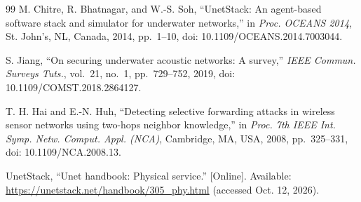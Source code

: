 \documentclass[11pt]{article}
\begin{document}
\begin{thebibliography}{99}
M. Chitre, R. Bhatnagar, and W.-S. Soh, ``UnetStack: An agent-based software stack and simulator for underwater networks,'' in \emph{Proc. OCEANS 2014}, St. John's, NL, Canada, 2014, pp.~1--10, doi: 10.1109/OCEANS.2014.7003044.

S. Jiang, ``On securing underwater acoustic networks: A survey,'' \emph{IEEE Commun. Surveys Tuts.}, vol.~21, no.~1, pp.~729--752, 2019, doi: 10.1109/COMST.2018.2864127.

T. H. Hai and E.-N. Huh, ``Detecting selective forwarding attacks in wireless sensor networks using two-hops neighbor knowledge,'' in \emph{Proc. 7th IEEE Int. Symp. Netw. Comput. Appl. (NCA)}, Cambridge, MA, USA, 2008, pp.~325--331, doi: 10.1109/NCA.2008.13.

UnetStack, ``Unet handbook: Physical service.'' [Online]. Available: \url{https://unetstack.net/handbook/305_phy.html} (accessed Oct. 12, 2026).

\end{thebibliography}
\end{document}

